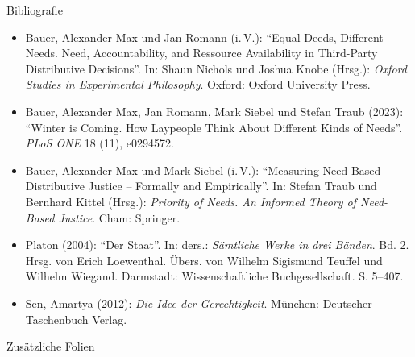 \documentclass[xcolor=table,9pt,aspectratio=169]{beamer}
\begin{document}
\begin{frame}{\vspace*{10mm}Bibliografie}
\vspace*{-10mm}
{\footnotesize
\begin{itemize}[label=,leftmargin=2em,itemindent=-2em]
   \item Bauer, Alexander Max und Jan Romann (i.\,V.): \enquote{Equal Deeds, Different Needs. Need, Accountability, and Ressource Availability in Third-Party Distributive Decisions}. In: Shaun Nichols und Joshua Knobe (Hrsg.): \textit{Oxford Studies in Experimental Philosophy}. Oxford: Oxford University Press.
   \item Bauer, Alexander Max, Jan Romann, Mark Siebel und Stefan Traub (2023): \enquote{Winter is Coming. How Laypeople Think About Different Kinds of Needs}. \textit{PLoS ONE} 18 (11), e0294572.
   \item Bauer, Alexander Max und Mark Siebel (i.\,V.): \enquote{Measuring Need-Based Distributive Justice -- Formally and Empirically}. In: Stefan Traub und Bernhard Kittel (Hrsg.): \textit{Priority of Needs. An Informed Theory of Need-Based Justice}. Cham: Springer.
   \item Platon (2004): \enquote{Der Staat}. In: ders.: \textit{Sämtliche Werke in drei Bänden}. Bd. 2. Hrsg. von Erich Loewenthal. Übers. von Wilhelm Sigismund Teuffel und Wilhelm Wiegand. Darmstadt: Wissenschaftliche Buchgesellschaft. S. 5--407.
   \item Sen, Amartya (2012): \textit{Die Idee der Gerechtigkeit}. München: Deutscher Taschenbuch Verlag.
\end{itemize}
}
\end{frame}


\begin{frame}
\begin{overlayarea}{\textwidth}{0.81\paperheight}
   {
   \vspace*{11mm}
   \textcolor{uolblue}
   {Zusätzliche Folien}
   }
\end{overlayarea}
\end{frame}
\end{document}
